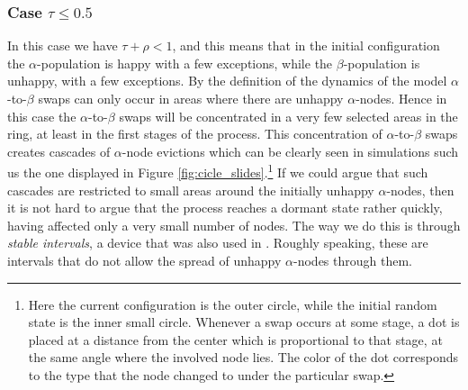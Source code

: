 \documentclass[11pt]{article}
\theoremstyle{plain}
\numberwithin{equation}{subsection}
\begin{document}
\subsubsection*{{\bf Case} \texorpdfstring {$\tau\leq 0.5$}{Static case}}
In this case we have $\tau+\rho<1$, and  this means that
 in the initial configuration 
  the $\alpha$-population is happy with a few exceptions, while
the $\beta$-population  is unhappy, with a few exceptions.
By the definition of the dynamics of the model $\alpha$-to-$\beta$
swaps can only occur in areas where there are unhappy $\alpha$-nodes.
Hence in this case
the $\alpha$-to-$\beta$ swaps will be concentrated in a very few selected areas in the ring,
at least in the first stages of the process.
This concentration of 
$\alpha$-to-$\beta$ swaps creates cascades of $\alpha$-node evictions which can be clearly
seen in simulations such us the one displayed 
in Figure  \ref{fig:cicle_slides}.\footnote{Here the current configuration is the outer circle, while the initial random
state is the inner small circle. Whenever a swap occurs at some stage, a dot is placed at a distance from the center which
is proportional to that stage, at the same angle where the involved node lies. The color of the dot corresponds to the type that the node changed to under the particular swap.} If we could argue that such cascades are restricted to
small areas around the initially unhappy $\alpha$-nodes, then it is not hard to argue that
the process reaches a dormant state rather quickly, having affected only a very 
small number of nodes. The way we do this is through {\em stable intervals}, 
a device that was also used in \cite{BELschel13}.
Roughly speaking, these are intervals that do not allow the spread of unhappy $\alpha$-nodes through them.
\end{document}
